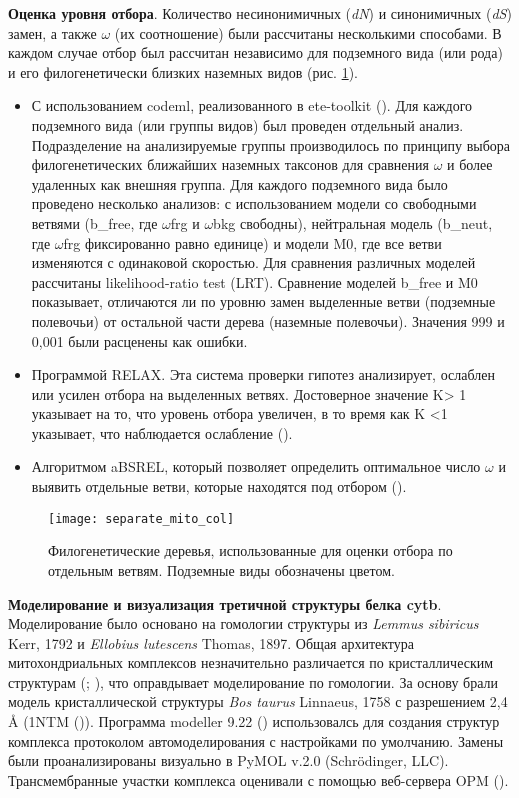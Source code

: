 \textbf{Оценка уровня отбора}. Количество несинонимичных (\textit{dN}) и синонимичных (\textit{dS}) замен, а также $\omega$ (их соотношение) были рассчитаны несколькими способами. В каждом случае отбор был рассчитан независимо для подземного вида (или рода) и его филогенетически близких наземных видов (рис. \ref{tree_mito}). 
\begin{itemize}
	\item[\textbullet] С использованием codeml, реализованного в ete-toolkit (\cite{Huerta-Cepas2016}). Для каждого подземного вида (или группы видов) был проведен отдельный анализ. Подразделение на анализируемые группы производилось по принципу выбора филогенетических ближайших наземных таксонов для сравнения $\omega$ и более удаленных как внешняя группа. Для каждого подземного вида было проведено несколько анализов: с использованием модели со свободными ветвями (b\_free, где $\omega$frg и $\omega$bkg свободны), нейтральная модель (b\_neut, где $\omega$frg фиксированно равно единице) и модели M0, где все ветви изменяются с одинаковой скоростью. Для сравнения различных моделей рассчитаны likelihood-ratio test (LRT). Сравнение моделей b\_free и M0 показывает, отличаются ли по уровню замен выделенные ветви (подземные полевочьи) от остальной части дерева (наземные полевочьи). Значения 999 и 0,001 были расценены как ошибки.
	\item[\textbullet] Программой RELAX. Эта система проверки гипотез анализирует, ослаблен или усилен отбора на выделенных ветвях. Достоверное значение K> 1 указывает на то, что уровень отбора увеличен, в то время как K <1 указывает, что наблюдается ослабление (\cite{Wertheim2015}).
	\item[\textbullet] Алгоритмом aBSREL, который позволяет определить оптимальное число $\omega$ и выявить отдельные ветви, которые находятся под отбором (\cite{Smith2015}).     
\end{itemize}

\begin{figure}[h!]
	\begin{center}
		\texttt{[image: separate\_mito\_col]}
	\end{center}
	\caption{Филогенетические деревья, использованные для оценки отбора по отдельным ветвям. Подземные виды обозначены цветом.}
	\label{tree_mito}
\end{figure}

\textbf{Моделирование и визуализация третичной структуры белка cytb}. Моделирование было основано на гомологии структуры из \textit{Lemmus sibiricus} Kerr, 1792 и \textit{Ellobius lutescens} Thomas, 1897. Общая архитектура митохондриальных комплексов незначительно различается по кристаллическим структурам (\cite{Crowley2008}; \cite{Hunte2000}), что оправдывает моделирование по гомологии. За основу брали модель кристаллической структуры  \textit{Bos taurus} Linnaeus, 1758 с разрешением 2,4 Å (1NTM (\cite{Gao2003})). Программа modeller 9.22 (\cite{Webb2016}) использовалсь для создания структур комплекса протоколом автомоделирования с настройками по умолчанию. Замены были проанализированы визуально в PyMOL v.2.0 (Schrödinger, LLC). Трансмембранные участки комплекса оценивали с помощью веб-сервера OPM (\cite{Lomize2012}). 


